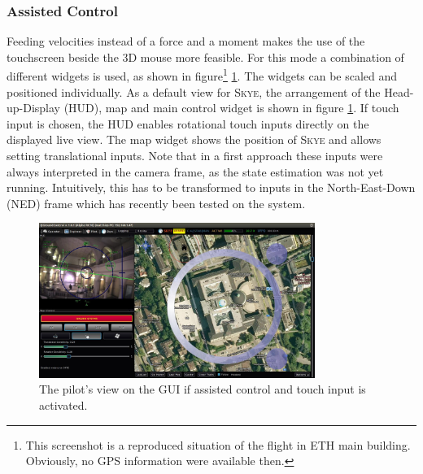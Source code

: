 \subsubsection{Assisted Control}
\label{subsub:assistedcontrol}
Feeding velocities instead of a force and a moment makes the use of the touchscreen beside the 3D mouse more feasible. For this mode a combination of different widgets is used, as shown in figure\footnote{This screenshot is a reproduced situation of the flight in ETH main building. Obviously, no GPS information were available then.} \ref{fig:qgc_manual_control}. The widgets can be scaled and positioned individually. As a default view for \textsc{Skye}, the arrangement of the Head-up-Display (HUD), map and main control widget is shown in figure \ref{fig:qgc_manual_control}. If touch input is chosen, the HUD enables rotational touch inputs directly on the displayed live view. The map widget shows the position of \textsc{Skye} and allows setting translational inputs. Note that in a first approach these inputs were always interpreted in the camera frame, as the state estimation was not yet running. Intuitively, this has to be transformed to inputs in the North-East-Down (NED) frame which has recently been tested on the system.

\begin{figure}[H] %
	\begin{center}
		\includegraphics[width=0.8\textwidth]{qgc_manual_control}
		\caption{The pilot's view on the GUI if assisted  control and touch input is activated.}  
		\label{fig:qgc_manual_control}		
	\end{center}
\end{figure}

